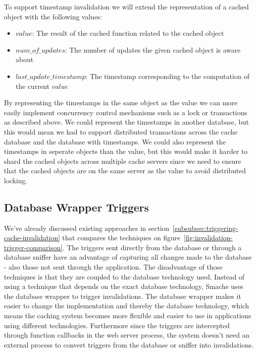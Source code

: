 To support timestamp invalidation we will extend the representation of a cached object with the following values:

\begin{itemize}
  \item $value$: The result of the cached function related to the cached object
  \item $num\_of\_updates$: The number of updates the given cached object is aware about
  \item $last\_update\_timestamp$: The timestamp corresponding to the computation of the current $value$
\end{itemize}

By representing the timestamps in the same object as the value we can more easily implement concurrency control mechanisms such as a lock or transactions as described above. We could represent the timestamps in another database, but this would mean we had to support distributed transactions across the cache database and the database with timestamps. We could also represent the timestamps in seperate objects than the value, but this would make it harder to shard the cached objects across multiple cache servers since we need to ensure that the cached objects are on the same server as the value to avoid distributed locking.


\subsection{Database Wrapper Triggers}
\label{subsec:database-wrapper-triggers}


We've already discussed existing approaches in section~\ref{subsubsec:triggering-cache-invalidation} that compares the techniques on figure~\ref{fig:invalidation-trigger-comparison}. The triggers sent directly from the database or through a database sniffer have an advantage of capturing all changes made to the database - also those not sent through the application. The disadvantage of those techniques is that they are coupled to the database technology used. Instead of using a technique that depends on the exact database technology, Smache uses the database wrapper to trigger invalidations. The database wrapper makes it easier to change the implementation and thereby the database technology, which means the caching system becomes more flexible and easier to use in applications using different technologies. Furthermore since the triggers are intercepted through function callbacks in the web server process, the system doesn't need an external process to convert triggers from the database or sniffer into invalidations.

